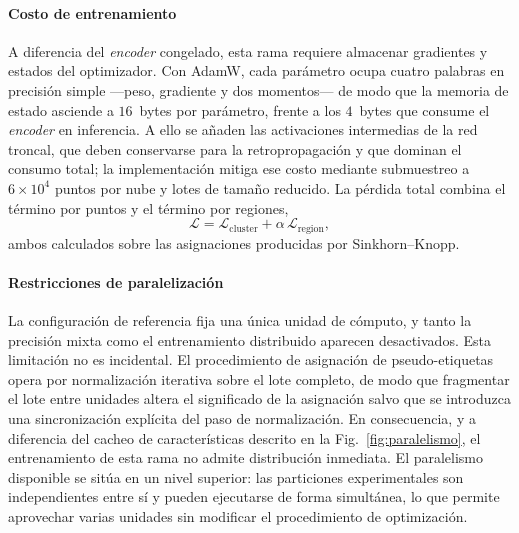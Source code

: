 \paragraph*{Costo de entrenamiento}
A diferencia del \emph{encoder} congelado, esta rama requiere almacenar
gradientes y estados del optimizador. Con AdamW, cada parámetro ocupa cuatro
palabras en precisión simple ---peso, gradiente y dos momentos--- de modo que la
memoria de estado asciende a $16$~bytes por parámetro, frente a los $4$~bytes que
consume el \emph{encoder} en inferencia. A ello se añaden las activaciones
intermedias de la red troncal, que deben conservarse para la retropropagación y
que dominan el consumo total; la implementación mitiga ese costo mediante
submuestreo a $6\times10^{4}$ puntos por nube y lotes de tamaño reducido. La
pérdida total combina el término por puntos y el término por regiones,
\begin{equation}
\mathcal{L}=\mathcal{L}_{\mathrm{cluster}}+\alpha\,\mathcal{L}_{\mathrm{region}} ,
\label{eq:perdida}
\end{equation}
ambos calculados sobre las asignaciones producidas por Sinkhorn--Knopp.

\paragraph*{Restricciones de paralelización}
La configuración de referencia fija una única unidad de cómputo, y tanto la
precisión mixta como el entrenamiento distribuido aparecen desactivados. Esta
limitación no es incidental. El procedimiento de asignación de pseudo-etiquetas
opera por normalización iterativa sobre el lote completo, de modo que fragmentar
el lote entre unidades altera el significado de la asignación salvo que se
introduzca una sincronización explícita del paso de normalización. En
consecuencia, y a diferencia del cacheo de características descrito en la
Fig.~\ref{fig:paralelismo}, el entrenamiento de esta rama no admite distribución
inmediata. El paralelismo disponible se sitúa en un nivel superior: las
particiones experimentales son independientes entre sí y pueden ejecutarse de
forma simultánea, lo que permite aprovechar varias unidades sin modificar el
procedimiento de optimización.

